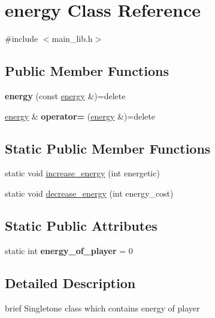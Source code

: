 \hypertarget{classenergy}{}\section{energy Class Reference}
\label{classenergy}


{\ttfamily \#include $<$main\+\_\+lib.\+h$>$}

\subsection*{Public Member Functions}
\begin{DoxyCompactItemize}
\item 
\mbox{\label{classenergy_ae0727ccd1ee08fab458a5dda04ae94e2}} 
{\bfseries energy} (const \mbox{\hyperlink{classenergy}{energy}} \&)=delete
\item 
\mbox{\label{classenergy_a8133f32df6151974850d759ec56893ef}} 
\mbox{\hyperlink{classenergy}{energy}} \& {\bfseries operator=} (\mbox{\hyperlink{classenergy}{energy}} \&)=delete
\end{DoxyCompactItemize}
\subsection*{Static Public Member Functions}
\begin{DoxyCompactItemize}
\item 
static void \mbox{\hyperlink{classenergy_a25298716dddd75c94bd034cc5f23033c}{increase\+\_\+energy}} (int energetic)
\item 
static void \mbox{\hyperlink{classenergy_a56d07f16cd58bbd82ff749fe010cbfd9}{decrease\+\_\+energy}} (int energy\+\_\+cost)
\end{DoxyCompactItemize}
\subsection*{Static Public Attributes}
\begin{DoxyCompactItemize}
\item 
\mbox{\label{classenergy_a72cc46cb6eee3522c180d3f857f9fedc}} 
static int {\bfseries energy\+\_\+of\+\_\+player} = 0
\end{DoxyCompactItemize}


\subsection{Detailed Description}
brief Singletone class which contains energy of player 

